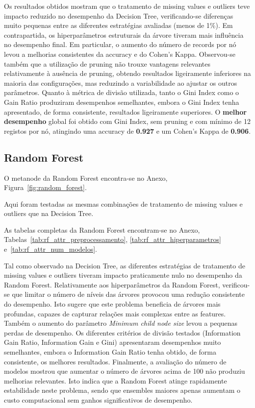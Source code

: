 \documentclass[11pt,a4paper]{article}
\begin{document}
Os resultados obtidos mostram que o tratamento de missing values e outliers teve impacto reduzido no desempenho da Decision Tree, verificando-se diferenças muito pequenas entre as diferentes estratégias avaliadas (menos de 1\%). Em contrapartida, os hiperparâmetros estruturais da árvore tiveram mais influência no desempenho final. Em particular, o aumento do número de records por nó levou a melhorias consistentes da accuracy e do Cohen's Kappa. Observou-se também que a utilização de pruning não trouxe vantagens relevantes relativamente à ausência de pruning, obtendo resultados ligeiramente inferiores na maioria das configurações, mas reduzindo a variabilidade ao ajustar os outros parâmetros. Quanto à métrica de divisão utilizada, tanto o Gini Index como o Gain Ratio produziram desempenhos semelhantes, embora o Gini Index tenha apresentado, de forma consistente, resultados ligeiramente superiores. O \textbf{melhor desempenho} global foi obtido com Gini Index, sem pruning e com mínimo de 12 registos por nó, atingindo uma accuracy de \textbf{0.927} e um Cohen's Kappa de \textbf{0.906}.

\subsection{Random Forest}

O metanode da Random Forest encontra-se no Anexo, Figura~\ref{fig:random_forest}.

Aqui foram testadas as mesmas combinações de tratamento de missing values e outliers que na Decision Tree.

As tabelas completas da Random Forest encontram-se no Anexo, Tabelas~\ref{tab:rf_attr_preprocessamento}, \ref{tab:rf_attr_hiperparametros} e~\ref{tab:rf_attr_num_modelos}.

Tal como observado na Decision Tree, as diferentes estratégias de tratamento de missing values e outliers tiveram impacto praticamente nulo no desempenho da Random Forest. Relativamente aos hiperparâmetros da Random Forest, verificou-se que limitar o número de níveis das árvores provocou uma redução consistente do desempenho. Isto sugere que este problema beneficia de árvores mais profundas, capazes de capturar relações mais complexas entre as features. Também o aumento do parâmetro \textit{Minimum child node size} levou a pequenas perdas de desempenho. Os diferentes critérios de divisão testados (Information Gain Ratio, Information Gain e Gini) apresentaram desempenhos muito semelhantes, embora o Information Gain Ratio tenha obtido, de forma consistente, os melhores resultados. Finalmente, a avaliação do número de modelos mostrou que aumentar o número de árvores acima de 100 não produziu melhorias relevantes. Isto indica que a Random Forest atinge rapidamente estabilidade neste problema, sendo que ensembles maiores apenas aumentam o custo computacional sem ganhos significativos de desempenho.
\end{document}
